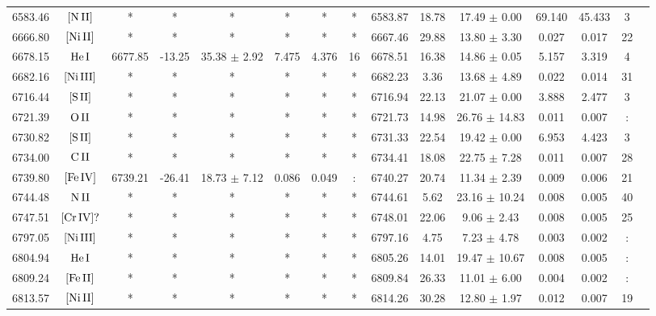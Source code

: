 \documentclass{article}
\begin{document}
\begin{table*}
\begin{adjustbox}{width=\textwidth}
\begin{tabular}{ccccccccccccccc}
6583.46 & $\mbox{[N}\thinspace \mbox{II]}$ & * & * & * & * & * & * & 6583.87 & 18.78 & 17.49 $\pm$ 0.00 & 69.140 & 45.433 & 3 &  \\
6666.80 & $\mbox{[Ni}\thinspace \mbox{II]}$ & * & * & * & * & * & * & 6667.46 & 29.88 & 13.80 $\pm$ 3.30 & 0.027 & 0.017 & 22 &  \\
6678.15 & $\mbox{He}\thinspace \mbox{I}$ & 6677.85 & -13.25 & 35.38 $\pm$ 2.92 & 7.475 & 4.376 & 16 & 6678.51 & 16.38 & 14.86 $\pm$ 0.05 & 5.157 & 3.319 & 4 &  \\
6682.16 & $\mbox{[Ni}\thinspace \mbox{III]}$ & * & * & * & * & * & * & 6682.23 & 3.36 & 13.68 $\pm$ 4.89 & 0.022 & 0.014 & 31 &  \\
6716.44 & $\mbox{[S}\thinspace \mbox{II]}$ & * & * & * & * & * & * & 6716.94 & 22.13 & 21.07 $\pm$ 0.00 & 3.888 & 2.477 & 3 &  \\
6721.39 & $\mbox{O}\thinspace \mbox{II}$ & * & * & * & * & * & * & 6721.73 & 14.98 & 26.76 $\pm$ 14.83 & 0.011 & 0.007 & : &  \\
6730.82 & $\mbox{[S}\thinspace \mbox{II]}$ & * & * & * & * & * & * & 6731.33 & 22.54 & 19.42 $\pm$ 0.00 & 6.953 & 4.423 & 3 &  \\
6734.00 & $\mbox{C}\thinspace \mbox{II}$ & * & * & * & * & * & * & 6734.41 & 18.08 & 22.75 $\pm$ 7.28 & 0.011 & 0.007 & 28 &  \\
6739.80 & $\mbox{[Fe}\thinspace \mbox{IV]}$ & 6739.21 & -26.41 & 18.73 $\pm$ 7.12 & 0.086 & 0.049 & : & 6740.27 & 20.74 & 11.34 $\pm$ 2.39 & 0.009 & 0.006 & 21 &  \\
6744.48 & $\mbox{N}\thinspace \mbox{II}$ & * & * & * & * & * & * & 6744.61 & 5.62 & 23.16 $\pm$ 10.24 & 0.008 & 0.005 & 40 &  \\
6747.51 & $\mbox{[Cr}\thinspace \mbox{IV]?}$ & * & * & * & * & * & * & 6748.01 & 22.06 & 9.06 $\pm$ 2.43 & 0.008 & 0.005 & 25 &  \\
6797.05 & $\mbox{[Ni}\thinspace \mbox{III]}$ & * & * & * & * & * & * & 6797.16 & 4.75 & 7.23 $\pm$ 4.78 & 0.003 & 0.002 & : &  \\
6804.94 & $\mbox{He}\thinspace \mbox{I}$ & * & * & * & * & * & * & 6805.26 & 14.01 & 19.47 $\pm$ 10.67 & 0.008 & 0.005 & : &  \\
6809.24 & $\mbox{[Fe}\thinspace \mbox{II]}$ & * & * & * & * & * & * & 6809.84 & 26.33 & 11.01 $\pm$ 6.00 & 0.004 & 0.002 & : &  \\
6813.57 & $\mbox{[Ni}\thinspace \mbox{II]}$ & * & * & * & * & * & * & 6814.26 & 30.28 & 12.80 $\pm$ 1.97 & 0.012 & 0.007 & 19 &  \\

\end{tabular}
\end{adjustbox}
\end{table*}
\end{document}
